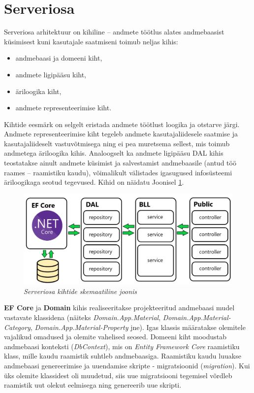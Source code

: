 \section{Serveriosa}
Serveriosa arhitektuur on kihiline -- andmete töötlus alates andmebaasist küsimisest kuni kasutajale saatmiseni toimub neljas kihis:
\begin{itemize}
    \item andmebaasi ja domeeni kiht,
    \item andmete ligipääsu kiht,
    \item äriloogika kiht,
    \item andmete representeerimise kiht.
\end{itemize}
Kihtide eesmärk on selgelt eristada andmete töötlust loogika ja otstarve järgi. Andmete representeerimise kiht tegeleb andmete 
kasutajaliidesele saatmise ja kasutajaliideselt vastuvõtmisega ning ei pea muretsema sellest, mis toimub andmetega äriloogika kihis. 
Analoogselt ka andmete ligipääsu DAL kihis teostatakse ainult andmete küsimist ja salvestamist andmebaasile
(antud töö raames -- raamistiku kaudu), võimalikult välistades igasugused infosüsteemi äriloogikaga seotud tegevused. 
Kihid on näidatu Joonisel \ref{fig:development_backend_layers}.

\begin{figure}[ht]
    \centering
    \includegraphics[width=1\textwidth]{figures/development/backend_structure.png}
    \caption[Serveriosa kihtide skemaatiline joonis]{\textit{Serveriosa kihtide skemaatiline joonis}}
    \label{fig:development_backend_layers}
\end{figure}
 

\textbf{EF Core} ja \textbf{Domain} kihis realiseeritakse projekteeritud andmebaasi mudel vastavate klassidena (näiteks \textit{Domain.App.Material},
\textit{Domain.App.Material-Category}, \textit{Domain.App.Material-Property} jne). Igas klassis määratakse olemitele vajalikud omadused ja
olemite vahelised seosed. Domeeni kiht moodustab andmebaasi konteksti (\textit{DbContext}), mis on \textit{Entity Framework Core} raamistiku klass,
mille kaudu raamistik suhtleb andmebaasiga. Raamistiku kaudu luuakse andmebaasi genereerimise ja uuendamise skripte - migratsioonid
(\textit{migration}). Kui üks olemite klassidest oli muudetud, siis uue migratsiooni tegemisel 
võrdleb raamistik uut olekut eelmisega ning genereerib uue skripti.


